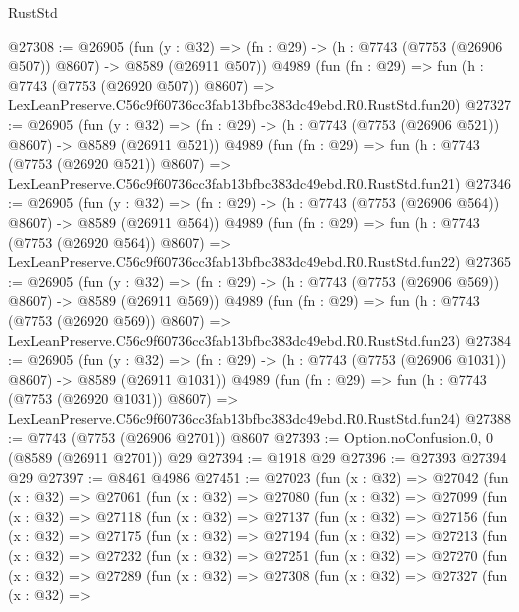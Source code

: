 \begin{lexlean}{RustStd}
\begin{coremodule}
@27308 := @26905
    (fun (y : @32) => (fn : @29) -> (h : @7743 (@7753 (@26906 @507)) @8607) -> @8589 (@26911 @507))
    @4989
    (fun (fn : @29) =>
    fun (h : @7743 (@7753 (@26920 @507)) @8607) =>
    LexLeanPreserve.C56c9f60736cc3fab13bfbc383dc49ebd.R0.RustStd.fun20)
@27327 := @26905
    (fun (y : @32) => (fn : @29) -> (h : @7743 (@7753 (@26906 @521)) @8607) -> @8589 (@26911 @521))
    @4989
    (fun (fn : @29) =>
    fun (h : @7743 (@7753 (@26920 @521)) @8607) =>
    LexLeanPreserve.C56c9f60736cc3fab13bfbc383dc49ebd.R0.RustStd.fun21)
@27346 := @26905
    (fun (y : @32) => (fn : @29) -> (h : @7743 (@7753 (@26906 @564)) @8607) -> @8589 (@26911 @564))
    @4989
    (fun (fn : @29) =>
    fun (h : @7743 (@7753 (@26920 @564)) @8607) =>
    LexLeanPreserve.C56c9f60736cc3fab13bfbc383dc49ebd.R0.RustStd.fun22)
@27365 := @26905
    (fun (y : @32) => (fn : @29) -> (h : @7743 (@7753 (@26906 @569)) @8607) -> @8589 (@26911 @569))
    @4989
    (fun (fn : @29) =>
    fun (h : @7743 (@7753 (@26920 @569)) @8607) =>
    LexLeanPreserve.C56c9f60736cc3fab13bfbc383dc49ebd.R0.RustStd.fun23)
@27384 := @26905
    (fun (y : @32) =>
    (fn : @29) -> (h : @7743 (@7753 (@26906 @1031)) @8607) -> @8589 (@26911 @1031))
    @4989
    (fun (fn : @29) =>
    fun (h : @7743 (@7753 (@26920 @1031)) @8607) =>
    LexLeanPreserve.C56c9f60736cc3fab13bfbc383dc49ebd.R0.RustStd.fun24)
@27388 := @7743 (@7753 (@26906 @2701)) @8607
@27393 := Option.noConfusion.{0, 0} (@8589 (@26911 @2701)) @29
@27394 := @1918 @29
@27396 := @27393 @27394 @29
@27397 := @8461 @4986
@27451 := @27023
    (fun (x : @32) =>
    @27042
      (fun (x : @32) =>
      @27061
        (fun (x : @32) =>
        @27080
          (fun (x : @32) =>
          @27099
            (fun (x : @32) =>
            @27118
              (fun (x : @32) =>
              @27137
                (fun (x : @32) =>
                @27156
                  (fun (x : @32) =>
                  @27175
                    (fun (x : @32) =>
                    @27194
                      (fun (x : @32) =>
                      @27213
                        (fun (x : @32) =>
                        @27232
                          (fun (x : @32) =>
                          @27251
                            (fun (x : @32) =>
                            @27270
                              (fun (x : @32) =>
                              @27289
                                (fun (x : @32) =>
                                @27308
                                  (fun (x : @32) =>
                                  @27327
                                    (fun (x : @32) =>

\end{coremodule}
\end{lexlean}
